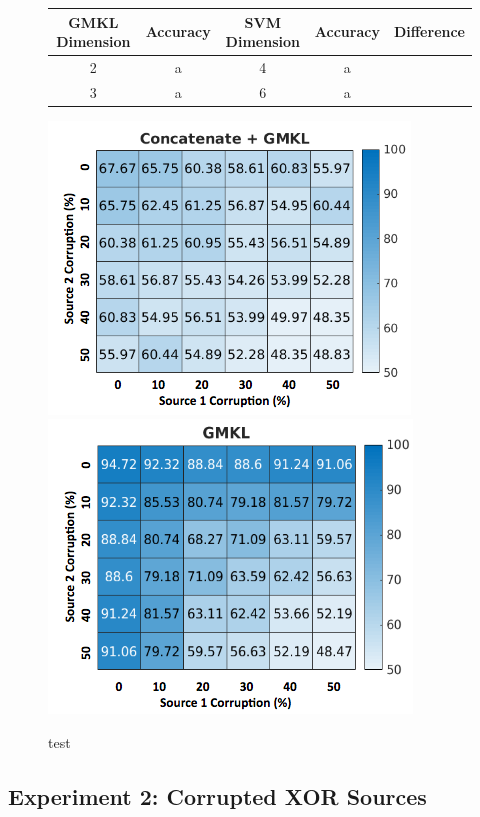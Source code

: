 \documentclass{article}
\begin{document}
\begin{figure}
\begin{center}
\begin{tabular}{|c| c| c| c| c| }
\hline
GMKL Dimension & Accuracy & SVM Dimension & Accuracy & Difference\\
\hline
2 & a & 4 & a\\
\hline
3 & a & 6 &a
\end{tabular}
\end{center}
\end{figure}

\begin{figure}[h]
\includegraphics[scale=0.6]{experimentpic2.png}
\includegraphics[scale=0.6]{experimentpic3.png}
\caption{test}
\end{figure}









\subsection{Experiment 2: Corrupted XOR Sources}
\end{document}
